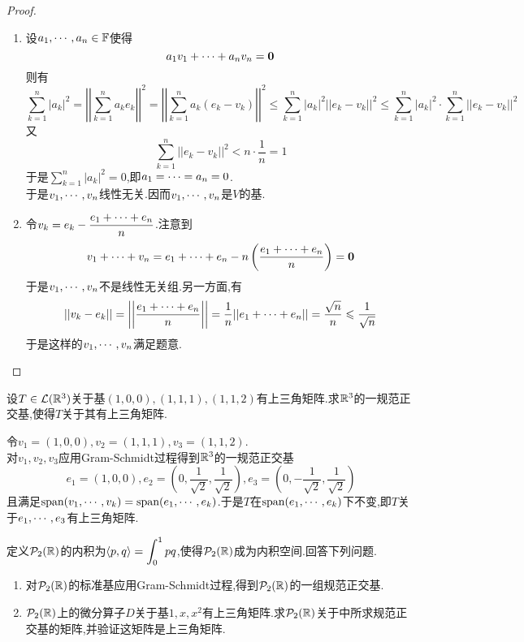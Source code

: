 \documentclass{ctexart}
\begin{document}
\begin{proof}
    \begin{enumerate}[label=\tbf{(\arabic*)}]
        \item 设${a}_1,\cdots,{a}_{n}\in\mathbb{F}$使得
            \[a_1v_1+\cdots+a_nv_n=\mathbf0\]
            则有
            \[\sum_{k=1}^{n}|a_k|^2=\left|\left|\sum_{k=1}^{n}a_ke_k\right|\right|^2
            =\left|\left|\sum_{k=1}^{n}a_k\left(e_k-v_k\right)\right|\right|^2
            \leqslant\sum_{k=1}^{n}|a_k|^2||e_k-v_k||^2
            \leqslant\sum_{k=1}^{n}|a_k|^2\cdot\sum_{k=1}^{n}||e_k-v_k||^2\]
            又
            \[\sum_{k=1}^{n}||e_k-v_k||^2<n\cdot\dfrac{1}{n}=1\]
            于是$\displaystyle\sum_{k=1}^{n}|a_k|^2=0$,即${a}_1=\cdots={a}_{n}=0$.\\
            于是${v}_1,\cdots,{v}_{n}$线性无关.因而${v}_1,\cdots,{v}_{n}$是$V$的基.
        \item 令$v_k=e_k-\dfrac{{e}_1+\cdots+{e}_{n}}{n}$.注意到
            \[{v}_1+\cdots+{v}_{n}={e}_1+\cdots+{e}_{n}-n\left(\dfrac{{e}_1+\cdots+{e}_{n}}{n}\right)=\mathbf0\]
            于是${v}_1,\cdots,{v}_{n}$不是线性无关组.另一方面,有
            \[\left|\left|v_k-e_k\right|\right|=\left|\left|\dfrac{{e}_1+\cdots+{e}_{n}}{n}\right|\right|=\dfrac{1}{n}||{e}_1+\cdots+{e}_{n}||=\dfrac{\sqrt{n}}{n}\leqslant\dfrac{1}{\sqrt{n}}\]
            于是这样的${v}_1,\cdots,{v}_{n}$满足题意.
    \end{enumerate}
\end{proof}
\begin{problem}[7.]
    设$T\in\mathcal{L}(\mathbb{R}^3)$关于基$(1,0,0),(1,1,1),(1,1,2)$有上三角矩阵.求$\mathbb{R}^3$的一规范正交基,使得$T$关于其有上三角矩阵.
\end{problem}
\begin{solution}
    令$v_1=(1,0,0),v_2=(1,1,1),v_3=(1,1,2)$.\\
    对$v_1,v_2,v_3$应用Gram-Schmidt过程得到$\mathbb{R}^3$的一规范正交基
    \[e_1=(1,0,0),e_2=\left(0,\dfrac{1}{\sqrt{2}},\dfrac{1}{\sqrt{2}}\right),e_3=\left(0,-\dfrac{1}{\sqrt{2}},\dfrac{1}{\sqrt{2}}\right)\]
    且满足$\text{span}({v}_1,\cdots,{v}_{k})=\text{span}({e}_1,\cdots,{e}_{k})$.于是$T$在$\text{span}({e}_1,\cdots,{e}_{k})$下不变,即$T$关于${e}_1,\cdots,{e}_{3}$有上三角矩阵.
\end{solution}
\begin{problem}[8.]
    定义$\mathcal{P}_2(\mathbb{R})$的内积为$\left\langle{p},{q}\right\rangle=\displaystyle\int_0^1pq$,使得$\mathcal{P}_2(\mathbb{R})$成为内积空间.回答下列问题.
    \begin{enumerate}[label=\tbf{(\arabic*)}]
        \item 对$\mathcal{P}_2(\mathbb{R})$的标准基应用Gram-Schmidt过程,得到$\mathcal{P}_2(\mathbb{R})$的一组规范正交基.
        \item $\mathcal{P}_2(\mathbb{R})$上的微分算子$D$关于基$1,x,x^2$有上三角矩阵.求$\mathcal{P}_2(\mathbb{R})$关于中所求规范正交基的矩阵,并验证这矩阵是上三角矩阵.
    \end{enumerate}
\end{problem}
\end{document}
